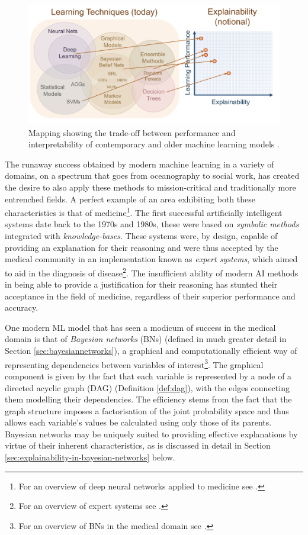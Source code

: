 \begin{figure}[htbp]
\centerline{\includegraphics[width=\textwidth]{introduction/images/darpa-comparison-methods}}
\caption{Mapping showing the trade-off between performance and interpretability of contemporary and older machine learning models \citep{gunning2017explainable}.}
\label{fig:darpa-comparison-methods}
\end{figure}

The runaway success obtained by modern machine learning in a variety of domains, on a spectrum that goes from oceanography to social work, has created the desire to also apply these methods to mission-critical and traditionally more entrenched fields.  
A perfect example of an area exhibiting both these characteristics is that of medicine\footnote{For an overview of deep neural networks applied to medicine see \citet{Travers2018}.}.  
The first successful artificially intelligent systems date back to the 1970s and 1980s, these were based on \textit{symbolic methods} integrated with \textit{knowledge-bases}.  
These systems were, by design, capable of providing an explanation for their reasoning and were thus accepted by the medical community in an implementation known as \textit{expert systems}, which aimed to aid in the diagnosis of disease\footnote{For an overview of expert systems see \citet{Liao2005}.}. 
The insufficient ability of modern AI methods in being able to provide a justification for their reasoning has stunted their acceptance in the field of medicine, regardless of their superior performance and accuracy.

One modern ML model that has seen a modicum of success in the medical domain is that of \textit{Bayesian networks} (BNs) (defined in much greater detail in Section \ref{sec:bayesiannetworks}), a graphical and computationally efficient way of representing dependencies between variables of interest\footnote{For an overview of BNs in the medical domain see \citet{Lucas2001}.}.  
The graphical component is given by the fact that each variable is represented by a node of a directed acyclic graph (DAG) (Definition \ref{def:dag}), with the edges connecting them modelling their dependencies.  
The efficiency stems from the fact that the graph structure imposes a factorisation of the joint probability space and thus allows each variable's values be calculated using only those of its parents.
Bayesian networks may be uniquely suited to providing effective explanations by virtue of their inherent characteristics, as is discussed in detail in Section \ref{sec:explainability-in-bayesian-networks} below.

